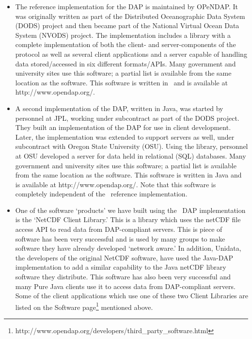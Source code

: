 \documentclass[justify]{dods-paper}
\begin{document}
\begin{itemize}
\item The reference implementation for the DAP is maintained by OPeNDAP. It
  was originally written as part of the Distributed Oceanographic Data System
  (DODS) project and then became part of the National Virtual Ocean Data
  System (NVODS) project. The implementation includes a library with a
  complete implementation of both the client- and server-components of the
  protocol as well as several client applications and a server capable of
  handling data stored/accessed in six different formats/APIs. Many
  government and university sites use this software; a partial list is
  available from the same location as the software. This software is written
  in \Cpp\ and is available at http://www.opendap.org/.

\item A second implementation of the DAP, written in Java, was started by
  personnel at JPL, working under subcontract as part of the DODS project.
  They built an implementation of the DAP for use in client development.
  Later, the implementation was extended to support servers as well, under
  subcontract with Oregon State University (OSU). Using the library,
  personnel at OSU developed a server for data held in relational (SQL)
  databases. Many government and university sites use this software; a
  partial list is available from the same location as the software. This
  software is written in Java and is available at http://www.opendap.org/.
  Note that this software is completely independent of the \Cpp\ reference
  implementation.

\item One of the software `products' we have built using the \Cpp\ DAP
  implementation is the `NetCDF Client Library.' This is a library which uses
  the netCDF file access API to read data from DAP-compliant servers. This is
  piece of software has been very successful and is used by many groups to
  make software they have already developed `network aware.' In addition,
  Unidata, the developers of the original NetCDF software, have used the
  Java-DAP implementation to add a similar capability to the Java netCDF
  library software they distribute. This software has also been very
  successful and many Pure Java clients use it to access data from
  DAP-compliant servers. Some of the client applications which use one of
  these two Client Libraries are listed on the Software
  page\footnote{http://www.opendap.org/developers/third\_party\_software.html}
  mentioned above.


\end{itemize}
\end{document}
